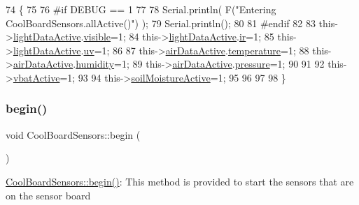 \begin{DoxyCode}
74 \{
75 
76 \textcolor{preprocessor}{#if DEBUG == 1 }
77 
78     Serial.println( F(\textcolor{stringliteral}{"Entering CoolBoardSensors.allActive()"}) );
79     Serial.println();
80 
81 \textcolor{preprocessor}{#endif}
82     
83     this->\hyperlink{class_cool_board_sensors_ac4deb1cf41bac8b91c780c92fab00ba4}{lightDataActive}.\hyperlink{struct_cool_board_sensors_1_1light_active_a9c351100969d0dc055ad2e6712cc7ac8}{visible}=1;
84     this->\hyperlink{class_cool_board_sensors_ac4deb1cf41bac8b91c780c92fab00ba4}{lightDataActive}.\hyperlink{struct_cool_board_sensors_1_1light_active_a4c21258d3c89c6292740d6deb10f9dcc}{ir}=1;
85     this->\hyperlink{class_cool_board_sensors_ac4deb1cf41bac8b91c780c92fab00ba4}{lightDataActive}.\hyperlink{struct_cool_board_sensors_1_1light_active_a0e6cfc311425a31f32c32fc3b834ffb8}{uv}=1;    
86 
87     this->\hyperlink{class_cool_board_sensors_abff8dfeccb2f7689847bb64d5f1cd31e}{airDataActive}.\hyperlink{struct_cool_board_sensors_1_1air_active_ac08576736c7ac3bfbfec32e5ee17c686}{temperature}=1;
88     this->\hyperlink{class_cool_board_sensors_abff8dfeccb2f7689847bb64d5f1cd31e}{airDataActive}.\hyperlink{struct_cool_board_sensors_1_1air_active_ab69738e9fd1c2ba80dc666bcd1e116f7}{humidity}=1;
89     this->\hyperlink{class_cool_board_sensors_abff8dfeccb2f7689847bb64d5f1cd31e}{airDataActive}.\hyperlink{struct_cool_board_sensors_1_1air_active_a15932ccfb6ee6603713d937ec9b76b72}{pressure}=1;
90 
91 
92     this->\hyperlink{class_cool_board_sensors_ab0b4bbae83796b52b90f91008d383583}{vbatActive}=1;
93 
94     this->\hyperlink{class_cool_board_sensors_ae7971bf527781ac4994309591b78ab89}{soilMoistureActive}=1;
95     
96 
97 
98 \}
\end{DoxyCode}
\mbox{\label{class_cool_board_sensors_a97095823ef7c8f5290812f1405b966b3}} 
\subsubsection{\texorpdfstring{begin()}{begin()}}
{\footnotesize\ttfamily void Cool\+Board\+Sensors\+::begin (\begin{DoxyParamCaption}{ }\end{DoxyParamCaption})}

\hyperlink{class_cool_board_sensors_a97095823ef7c8f5290812f1405b966b3}{Cool\+Board\+Sensors\+::begin()}\+: This method is provided to start the sensors that are on the sensor board 

